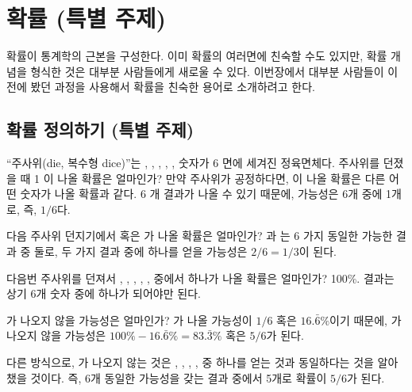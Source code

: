 \chapter[Probability (special topic)]{확률 (특별 주제)}
\label{probability}


확률이 통계학의 근본을 구성한다. 이미 확률의 여러면에 친숙할 수도 있지만, 확률 개념을 형식한 것은 대부분 사람들에게 새로울 수 있다. 이번장에서 대부분 사람들이 이전에 봤던 과정을 사용해서 확률을 친숙한 용어로 소개하려고 한다.

\section{확률 정의하기 (특별 주제)}
\label{basicsOfProbability}


\begin{example}{``주사위(die, 복수형 dice)''는 , , , , ,  숫자가 6 면에 세겨진 정육면체다. 주사위를 던졌을 때 1 이 나올 확률은 얼마인가?}\label{probOf1}
만약 주사위가 공정하다면, 이 나올 확률은 다른 어떤 숫자가 나올 확률과 같다. 6 개 결과가 나올 수 있기 때문에, 가능성은 6개 중에 1개로, 즉, $1/6$다.
\end{example}

\begin{example}{다음 주사위 던지기에서  혹은 가 나올 확률은 얼마인가?}\label{probOf1Or2}
 과  는 6 가지 동일한 가능한 결과 중 둘로, 두 가지 결과 중에 하나를 얻을 가능성은 $2/6 = 1/3$이 된다.
\end{example}

\begin{example}{다음번 주사위를 던져서 , , , , ,  중에서 하나가 나올 확률은 얼마인가?}\label{probOf123456}
100\%. 결과는 상기 6개 숫자 중에 하나가 되어야만 된다.
\end{example}

\begin{example}{ 가 나오지 않을 가능성은 얼마인가?}\label{probNot2}
가 나올 가능성이 $1/6$ 혹은 $16.\bar{6}\%$이기 때문에, 가 나오지 않을 가능성은 $100\% - 16.\bar{6}\%=83.\bar{3}\%$ 혹은 $5/6$가 된다.

다른 방식으로, 가 나오지 않는 것은 , , , ,  중 하나를 얻는 것과 동일하다는 것을 알아챘을 것이다. 즉, 6개 동일한 가능성을 갖는 결과 중에서 5개로 확률이 $5/6$가 된다.
\end{example}

